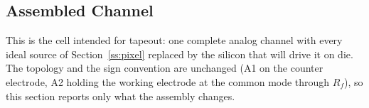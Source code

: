 %
%

\subsection{Assembled Channel}\label{ss:pixtop}

This is the cell intended for tapeout: one complete analog channel with every
ideal source of Section~\ref{ss:pixel} replaced by the silicon that will drive
it on die. The topology and the sign convention are unchanged (A1 on the
counter electrode, A2 holding the working electrode at the common mode through
\(R_f\)), so this section reports only what the assembly changes.

